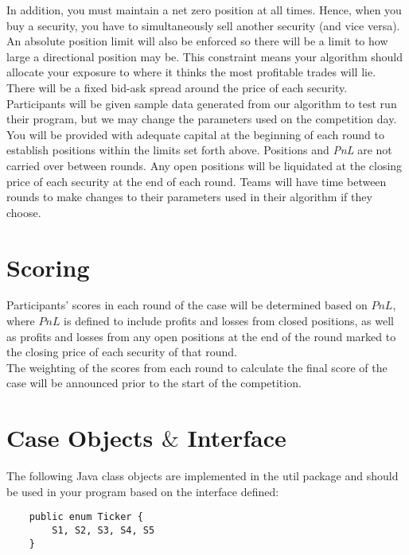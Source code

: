 \documentclass{amsart}
\renewcommand{\_}[1]{\underline{ #1 }}
\theoremstyle{definition}
\numberwithin{equation}{subsection}
\begin{document}
In addition, you must maintain a net zero position at all times. Hence, when you buy a security, you have to simultaneously sell another security (and vice versa). \\

An absolute position limit will also be enforced so there will be a limit to how large a directional position may be. This constraint means your algorithm should allocate your exposure to where it thinks the most profitable trades will lie. \\

There will be a fixed bid-ask spread around the price of each security. \\

Participants will be given sample data generated from our algorithm to test run their program, but we may change the parameters used on the competition day.  You will be provided with adequate capital at the beginning of each round to establish positions within the limits set forth above. Positions and {\it PnL} are not carried over between rounds. Any open positions will be liquidated at the closing price of each security at the end of each round. Teams will have time between rounds to make changes to their parameters used in their algorithm if they choose.  

\section{Scoring}
Participants' scores in each round of the case will be determined based on $PnL$, where $PnL$ is defined to include profits and losses from closed positions, as well as profits and losses from any open positions at the end of the round marked to the closing price of each security of that round. 
\\

The weighting of the scores from each round to calculate the final score of the case will be announced prior to the start of the competition. 


\section{Case Objects $\&$ Interface}

The following Java class objects are implemented in the util package and should be used in your program based on the interface defined:

\begin{verbatim}
    public enum Ticker {
        S1, S2, S3, S4, S5
    }
\end{verbatim}
\end{document}
